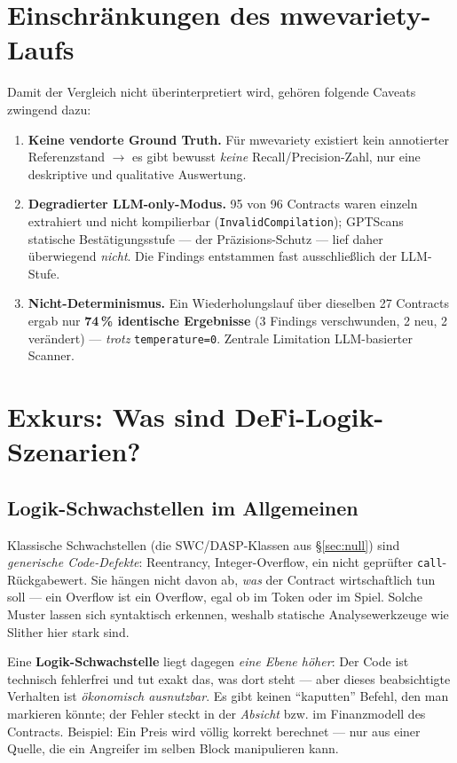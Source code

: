 \documentclass[11pt,a4paper]{scrartcl}
\newcommand{\code}[1]{\texttt{#1}}
\begin{document}
\section{Einschränkungen des mwevariety-Laufs}

Damit der Vergleich nicht überinterpretiert wird, gehören folgende Caveats zwingend dazu:
\begin{enumerate}[leftmargin=1.6em]
  \item \textbf{Keine vendorte Ground Truth.} Für mwevariety existiert kein
    annotierter Referenzstand $\rightarrow$ es gibt bewusst \emph{keine} Recall/Precision-Zahl,
    nur eine deskriptive und qualitative Auswertung.
  \item \textbf{Degradierter LLM-only-Modus.} 95 von 96 Contracts waren einzeln
    extrahiert und nicht kompilierbar (\code{InvalidCompilation}); GPTScans statische
    Bestätigungsstufe — der Präzisions-Schutz — lief daher überwiegend \emph{nicht}.
    Die Findings entstammen fast ausschließlich der LLM-Stufe.
  \item \textbf{Nicht-Determinismus.} Ein Wiederholungslauf über dieselben 27
    Contracts ergab nur \textbf{74\,\% identische Ergebnisse} (3 Findings verschwunden,
    2 neu, 2 verändert) --- \emph{trotz} \code{temperature=0}. Zentrale Limitation
    LLM-basierter Scanner.
\end{enumerate}

\section{Exkurs: Was sind DeFi-Logik-Szenarien?}
\label{sec:exkurs}

\subsection*{Logik-Schwachstellen im Allgemeinen}

Klassische Schwachstellen (die SWC/DASP-Klassen aus \S\ref{sec:null}) sind
\emph{generische Code-Defekte}: Reentrancy, Integer-Overflow, ein nicht geprüfter
\code{call}-Rückgabewert. Sie hängen nicht davon ab, \emph{was} der Contract
wirtschaftlich tun soll --- ein Overflow ist ein Overflow, egal ob im Token oder im
Spiel. Solche Muster lassen sich syntaktisch erkennen, weshalb statische Analysewerkzeuge
wie Slither hier stark sind.

Eine \textbf{Logik-Schwachstelle} liegt dagegen \emph{eine Ebene höher}: Der Code ist
technisch fehlerfrei und tut exakt das, was dort steht --- aber dieses beabsichtigte
Verhalten ist \emph{ökonomisch ausnutzbar}. Es gibt keinen \enquote{kaputten} Befehl,
den man markieren könnte; der Fehler steckt in der \emph{Absicht} bzw. im
Finanzmodell des Contracts. Beispiel: Ein Preis wird völlig korrekt berechnet ---
nur aus einer Quelle, die ein Angreifer im selben Block manipulieren kann.
\end{document}
